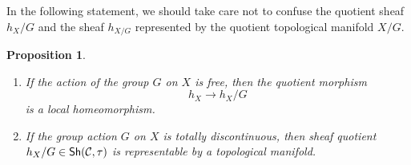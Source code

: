 \documentclass{tufte-book} %
\numberwithin{dummy}{section}
\newtheorem{prop}[thm]{Proposition}
\newcommand{\calc}{{\cal C}}
\newcommand{\lrta}{\longrightarrow}
\begin{document}
In the following statement, we should take care not to confuse the quotient sheaf $h_X/G$ and the sheaf $h_{X/G}$ represented by the quotient topological manifold $X/G$.

\begin{prop}\label{prop:quotient_group_action}
\ \begin{enumerate}
\item If the action of the group $G$ on $X$ is free, then the quotient morphism 
$$
h_X\lrta h_X/G
$$
is a local homeomorphism.
\item If the group action $G$ on $X$ is totally discontinuous, then sheaf quotient $h_X/G\in \mathsf{Sh}(\calc,\tau)$ is representable by a topological manifold.
\end{enumerate}
\end{prop}
\end{document}
